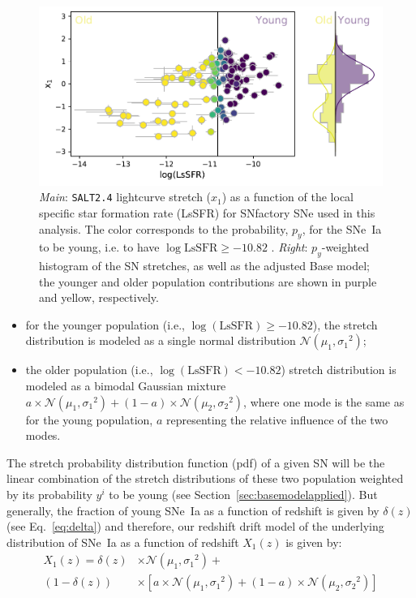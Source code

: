 \documentclass[]{aa}
\begin{document}
\begin{figure}
    \centering
    \includegraphics[width=0.8\linewidth]{Article_figures/model_base_hist.pdf}
    \caption{\textit{Main}: \textsc{\texttt{SALT2.4}} lightcurve stretch ($x_1$)
        as a function of the local specific star formation rate (LsSFR) for
        SNfactory SNe used in this analysis. The color corresponds to the
        probability, $p_y$, for the SNe~Ia to be young, i.e. to have
        $\log\mathrm{LsSFR} \geq -10.82$ \citep[see][]{rigault2018}.
        \textit{Right}: $p_y$-weighted histogram of the SN stretches, as well as
        the adjusted Base model; the younger and older population contributions
        are shown in purple and yellow, respectively.}
    \label{fig:stretchlssfr}
\end{figure}

\begin{itemize}
    \item for the younger population (i.e., $\log(\mathrm{LsSFR})\geq-10.82$),
        the stretch distribution is modeled as a single normal distribution
        $\mathcal{N}(\mu_1, \sigma_1{}^2)$; 
    \item the older population (i.e., $\log( \mathrm{LsSFR})<-10.82$) stretch
        distribution is modeled as a bimodal Gaussian mixture $a\times
        \mathcal{N}(\mu_1, \sigma_1{}^2) + (1-a)\times \mathcal{N}(\mu_2,
        \sigma_2{}^2)$, where one mode is the same as for the young population,
        $a$ representing the relative influence of the two modes.
\end{itemize}

The stretch probability distribution function (pdf) of a given SN will be the
linear combination of the stretch distributions of these two population weighted
by its probability $y^i$ to be young (see Section~\ref{sec:basemodelapplied}).
But generally, the fraction of young SNe~Ia as a function of redshift is given
by $\delta(z)$ (see Eq.~\ref{eq:delta}) and therefore, our redshift drift model
of the underlying distribution of SNe~Ia as a function of redshift $X_1(z)$ is
given by:
\begin{align}\label{eq:stretchz}
    X_1(z) = \delta(z)&\times \mathcal{N}(\mu_1,\sigma_1{}^2) + \nonumber \\
    (1-\delta(z))&\times \left[ a\times\mathcal{N}(\mu_1,\sigma_1{}^2) +
    (1-a)\times\mathcal{N}(\mu_2,\sigma_2{}^2) \right]
\end{align}
\end{document}
